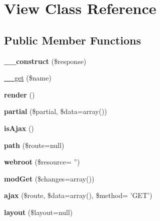\hypertarget{classView}{
\section{View Class Reference}
\label{classView}
}
\subsection*{Public Member Functions}
\begin{DoxyCompactItemize}
\item 
\hypertarget{classView_aff2c8a304801730574b5bc109c482e09}{
{\bfseries \_\-\_\-construct} (\$response)}
\label{classView_aff2c8a304801730574b5bc109c482e09}

\item 
\hyperlink{classView_a82676edf021e4e4e89bd6d4876ad7fb9}{\_\-\_\-get} (\$name)
\item 
\hypertarget{classView_ad6b9299348ecf7eb493628ed7f5af3c5}{
{\bfseries render} ()}
\label{classView_ad6b9299348ecf7eb493628ed7f5af3c5}

\item 
\hypertarget{classView_ad28ba2a16ab546f22dd5a60e65f20d2a}{
{\bfseries partial} (\$partial, \$data=array())}
\label{classView_ad28ba2a16ab546f22dd5a60e65f20d2a}

\item 
\hypertarget{classView_a1e38f96f791a0d264ea794ccd1c7c8ee}{
{\bfseries isAjax} ()}
\label{classView_a1e38f96f791a0d264ea794ccd1c7c8ee}

\item 
\hypertarget{classView_ab4e4860b85376521eff6579b1f386715}{
{\bfseries path} (\$route=null)}
\label{classView_ab4e4860b85376521eff6579b1f386715}

\item 
\hypertarget{classView_a604713b6fdc5d37523d60839652fdcd5}{
{\bfseries webroot} (\$resource= '')}
\label{classView_a604713b6fdc5d37523d60839652fdcd5}

\item 
\hypertarget{classView_acb1fea2da6c574abd3954f1c9271d451}{
{\bfseries modGet} (\$changes=array())}
\label{classView_acb1fea2da6c574abd3954f1c9271d451}

\item 
\hypertarget{classView_a3c6dd7873c2b0bb4e4d9e39638c42bb0}{
{\bfseries ajax} (\$route, \$data=array(), \$method= 'GET')}
\label{classView_a3c6dd7873c2b0bb4e4d9e39638c42bb0}

\item 
\hypertarget{classView_a91dbfe549a40feaacb321d64997461fa}{
{\bfseries layout} (\$layout=null)}
\label{classView_a91dbfe549a40feaacb321d64997461fa}

\end{DoxyCompactItemize}
